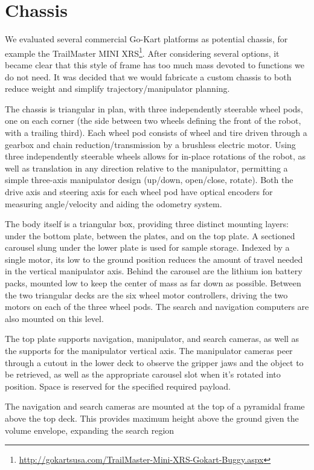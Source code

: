 \documentclass[12pt]{article}
\begin{document}
\section{Chassis}\label{Chassis}

We evaluated several commercial Go-Kart platforms as potential chassis, for example the TrailMaster MINI XRS\footnote{ \url{http://gokartsusa.com/TrailMaster-Mini-XRS-Gokart-Buggy.aspx}}. After considering several options, it became clear that this style of frame has too much mass devoted to functions we do not need. It was decided that we would fabricate a custom chassis to both reduce weight and simplify trajectory/manipulator planning.

The chassis is triangular in plan, with three independently steerable wheel pods, one on each corner (the side between two wheels defining the front of the robot, with a trailing third). Each wheel pod consists of wheel and tire driven through a gearbox and chain reduction/transmission by a brushless electric motor. Using three independently steerable wheels allows for in-place rotations of the robot, as well as translation in any direction relative to the manipulator, permitting a simple three-axis manipulator design (up/down, open/close, rotate). Both the drive axis and steering axis for each wheel pod have optical encoders for measuring angle/velocity and aiding the odometry system.

The body itself is a triangular box, providing three distinct mounting layers: under the bottom plate, between the plates, and on the top plate. A sectioned carousel slung under the lower plate is used for sample storage. Indexed by a single motor, its low to the ground position reduces the amount of travel needed in the vertical manipulator axis. Behind the carousel are the lithium ion battery packs, mounted low to keep the center of mass as far down as possible. Between the two triangular decks are the six wheel motor controllers, driving the two motors on each of the three wheel pods. The search and navigation computers are also mounted on this level.

The top plate supports navigation, manipulator, and search cameras, as well as the supports for the manipulator vertical axis. The manipulator cameras peer through a cutout in the lower deck to observe the gripper jaws and the object to be retrieved, as well as the appropriate carousel slot when it's rotated into position. Space is reserved for the specified required payload.

The navigation and search cameras are mounted at the top of a pyramidal frame above the top deck. This provides maximum height above the ground given the volume envelope, expanding the search region
\end{document}

